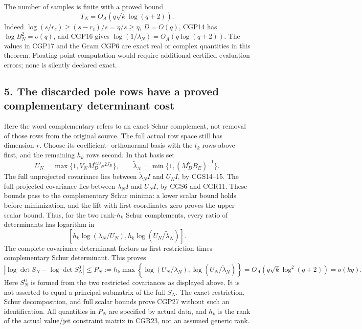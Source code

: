 The number of samples is finite with a proved bound \[
T_N=O_A(q\sqrt k\log(q+2)).
\tag{CGP25}
\] Indeed \(\log(s/r_c)\ge(s-r_c)/s=\eta/s\ge\eta\), \(D=O(q)\), CGP14 has \(\log B_N^2=o(q)\), and CGP16 gives \(\log(1/\lambda_N)=O_A(q\log(q+2))\). The values in CGP17 and the Gram CGP6 are exact real or complex quantities in this theorem. Floating-point computation would require additional certified evaluation errors; none is silently declared exact.

\subsection{5. The discarded pole rows have a proved complementary determinant cost}\label{the-discarded-pole-rows-have-a-proved-complementary-determinant-cost}

Here the word complementary refers to an exact Schur complement, not removal of those rows from the original source. The full actual row space still has dimension \(r\). Choose its coefficient- orthonormal basis with the \(t_k\) rows above first, and the remaining \(h_k\) rows second. In that basis set \[
U_N=\max\{1,V_NM_D^{2D}e^{2J_D}\},\qquad
\widetilde\lambda_N=\min\{1,(M_D^2B_E)^{-1}\}.
\tag{CGP26}
\] The full unprojected covariance lies between \(\widetilde\lambda_N I\) and \(U_NI\), by CGS14--15. The full projected covariance lies between \(\lambda_N I\) and \(U_NI\), by CGS6 and CGR11. These bounds pass to the complementary Schur minima: a lower scalar bound holds before minimization, and the lift with first coordinates zero proves the upper scalar bound. Thus, for the two rank-\(h_k\) Schur complements, every ratio of determinants has logarithm in \[
\left[h_k\log(\lambda_N/U_N),
h_k\log(U_N/\widetilde\lambda_N)\right].
\] The complete covariance determinant factors as first restriction times complementary Schur determinant. This proves \[
\boxed{|\log\det S_N-\log\det S_N^0|
\le P_N:=h_k\max\left\{
\log(U_N/\lambda_N),\log(U_N/\widetilde\lambda_N)\right\}
=O_A(q\sqrt k\log^2(q+2))=o(kq).}
\tag{CGP27}
\] Here \(S_N^0\) is formed from the two restricted covariances as displayed above. It is not asserted to equal a principal submatrix of the full \(S_N\). The exact restriction, Schur decomposition, and full scalar bounds prove CGP27 without such an identification. All quantities in \(P_N\) are specified by actual data, and \(h_k\) is the rank of the actual value/jet constraint matrix in CGR23, not an assumed generic rank.

